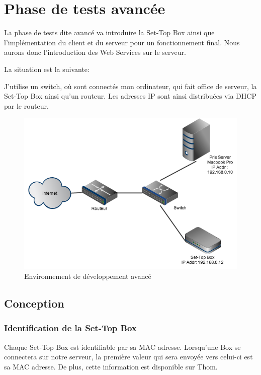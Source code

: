 
\chapter{Phase de tests avancée}
La phase de tests dite avancé va introduire la Set-Top Box ainsi que l'implémentation du client et du serveur pour un fonctionnement final. Nous aurons donc l'introduction des Web Services sur le serveur.

La situation est la suivante:

\medskip

J'utilise un switch, où sont connectés mon ordinateur, qui fait office de serveur, la Set-Top Box ainsi qu'un routeur. Les adresses IP sont ainsi distribuées via DHCP par le routeur.

\begin{figure}[H]
      \centering
      \includegraphics[width=\textwidth]{00_media/env_avance}
      \caption{Environnement de développement avancé}
      \label{gra:maqmenu}
\end{figure}
\section{Conception}

\subsection{Identification de la Set-Top Box}
Chaque Set-Top Box est identifiable par sa MAC adresse. Lorsqu'une Box se connectera sur notre serveur, la première valeur qui sera envoyée vers celui-ci est sa MAC adresse. De plus, cette information est disponible sur Thom.

